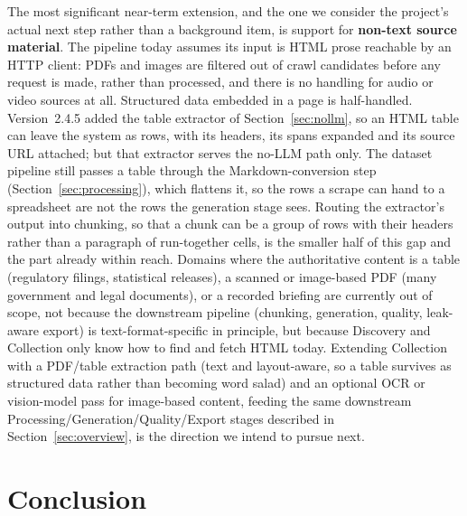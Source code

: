 \documentclass[11pt]{article}
\begin{document}
The most significant near-term extension, and the one we consider the
project's actual next step rather than a background item, is support for
\textbf{non-text source material}. The pipeline today assumes its input
is HTML prose reachable by an HTTP client: PDFs and images are filtered
out of crawl candidates before any request is made, rather than processed,
and there is no handling for audio or video sources at all. Structured
data embedded in a page is half-handled. Version~2.4.5 added the table
extractor of Section~\ref{sec:nollm}, so an HTML table can leave the
system as rows, with its headers, its spans expanded and its source URL
attached; but that extractor serves the no-LLM path only. The dataset
pipeline still passes a table through the Markdown-conversion step
(Section~\ref{sec:processing}), which flattens it, so the rows a scrape
can hand to a spreadsheet are not the rows the generation stage sees.
Routing the extractor's output into chunking, so that a chunk can be a
group of rows with their headers rather than a paragraph of run-together
cells, is the smaller half of this gap and the part already within
reach. Domains where the authoritative content is a table (regulatory
filings, statistical releases), a scanned or
image-based PDF (many government and legal documents), or a recorded
briefing are currently out of scope, not because the downstream
pipeline (chunking, generation, quality, leak-aware export) is
text-format-specific in principle, but because Discovery and Collection
only know how to find and fetch HTML today. Extending Collection with a
PDF/table extraction path (text and layout-aware, so a table survives as
structured data rather than becoming word salad) and an
optional OCR or vision-model pass for image-based content, feeding the
same downstream Processing/Generation/Quality/Export stages described in
Section~\ref{sec:overview}, is the direction we intend to pursue next.

\section{Conclusion}
\end{document}

